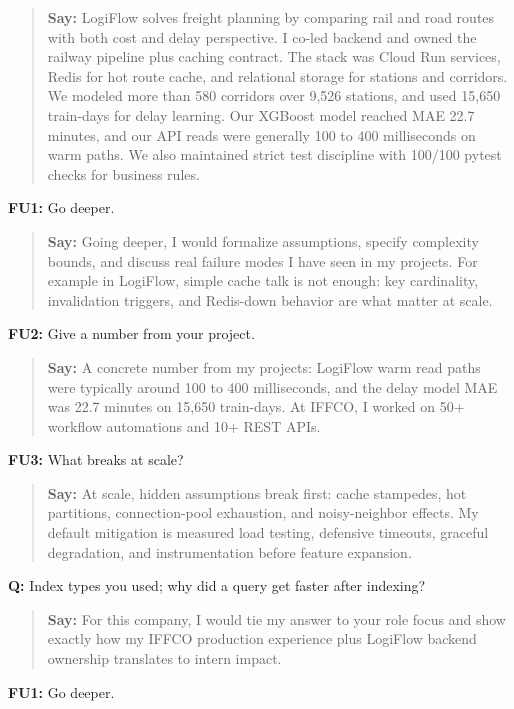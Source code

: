\documentclass[9pt,a4paper]{article}
\begin{document}
\begin{quote}\small\textbf{Say:} LogiFlow solves freight planning by comparing rail and road routes with both cost and delay perspective. I co-led backend and owned the railway pipeline plus caching contract. The stack was Cloud Run services, Redis for hot route cache, and relational storage for stations and corridors. We modeled more than 580 corridors over 9,526 stations, and used 15,650 train-days for delay learning. Our XGBoost model reached MAE 22.7 minutes, and our API reads were generally 100 to 400 milliseconds on warm paths. We also maintained strict test discipline with 100/100 pytest checks for business rules.\end{quote}
\vspace{2mm}
\textbf{FU1:} Go deeper.

\begin{quote}\small\textbf{Say:} Going deeper, I would formalize assumptions, specify complexity bounds, and discuss real failure modes I have seen in my projects. For example in LogiFlow, simple cache talk is not enough: key cardinality, invalidation triggers, and Redis-down behavior are what matter at scale.\end{quote}
\vspace{2mm}
\textbf{FU2:} Give a number from your project.

\begin{quote}\small\textbf{Say:} A concrete number from my projects: LogiFlow warm read paths were typically around 100 to 400 milliseconds, and the delay model MAE was 22.7 minutes on 15,650 train-days. At IFFCO, I worked on 50+ workflow automations and 10+ REST APIs.\end{quote}
\vspace{2mm}
\textbf{FU3:} What breaks at scale?

\begin{quote}\small\textbf{Say:} At scale, hidden assumptions break first: cache stampedes, hot partitions, connection-pool exhaustion, and noisy-neighbor effects. My default mitigation is measured load testing, defensive timeouts, graceful degradation, and instrumentation before feature expansion.\end{quote}
\vspace{2mm}
\textbf{Q:} Index types you used; why did a query get faster after indexing?

\begin{quote}\small\textbf{Say:} For this company, I would tie my answer to your role focus and show exactly how my IFFCO production experience plus LogiFlow backend ownership translates to intern impact.\end{quote}
\vspace{2mm}
\textbf{FU1:} Go deeper.
\end{document}
